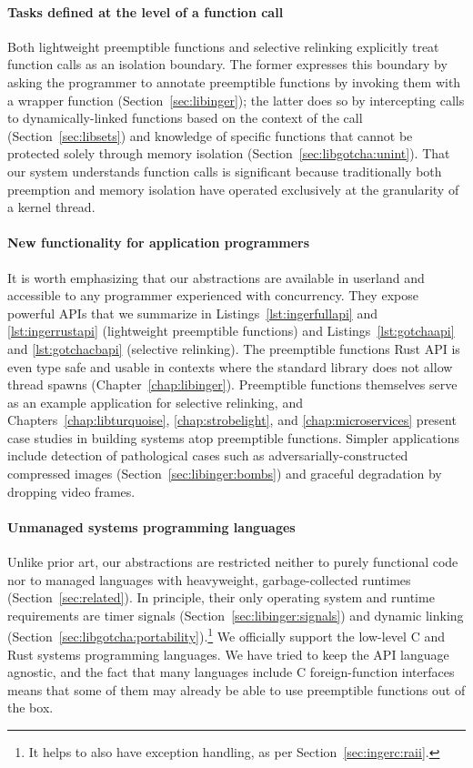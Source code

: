 \paragraph{Tasks defined at the level of a function call}
Both lightweight preemptible functions and selective relinking explicitly treat
function calls as an isolation boundary.  The former expresses this boundary by
asking the programmer to annotate preemptible functions by invoking them with a
wrapper function (Section~\ref{sec:libinger}); the latter does so by intercepting
calls to dynamically-linked functions based on the context of the call
(Section~\ref{sec:libsets}) and knowledge of specific functions that cannot be
protected solely through memory isolation (Section~\ref{sec:libgotcha:unint}).  That
our system understands function calls is significant because traditionally both
preemption and memory isolation have operated exclusively at the granularity of a
kernel thread.

\paragraph{New functionality for application programmers}
\begin{sloppypar}
It is worth emphasizing that our abstractions are available in userland and
accessible to any programmer experienced with concurrency.  They expose powerful APIs
that we summarize in Listings~\ref{lst:ingerfullapi} and \ref{lst:ingerrustapi}
(lightweight preemptible functions) and Listings~\ref{lst:gotchaapi} and
\ref{lst:gotchacbapi} (selective relinking).  The preemptible functions Rust API is
even type safe and usable in contexts where the standard library does not allow
thread spawns (Chapter~\ref{chap:libinger}).  Preemptible functions themselves serve
as an example application for selective relinking, and
Chapters~\ref{chap:libturquoise}, \ref{chap:strobelight}, and
\ref{chap:microservices} present case studies in building systems atop preemptible
functions.  Simpler applications include detection of pathological cases such as
adversarially-constructed compressed images (Section~\ref{sec:libinger:bombs}) and
graceful degradation by dropping video frames.
\end{sloppypar}

\paragraph{Unmanaged systems programming languages}
Unlike prior art, our abstractions are restricted neither to purely functional code
nor to managed languages with heavyweight, garbage-collected runtimes
(Section~\ref{sec:related}).  In principle, their only operating system and runtime
requirements are timer signals (Section~\ref{sec:libinger:signals}) and dynamic
linking (Section~\ref{sec:libgotcha:portability}).\footnote{It helps to also have
exception handling, as per Section~\ref{sec:ingerc:raii}.}  We officially support the
low-level C and Rust systems programming languages.  We have tried to keep the API
language agnostic, and the fact that many languages include C foreign-function
interfaces means that some of them may already be able to use preemptible functions
out of the box.

